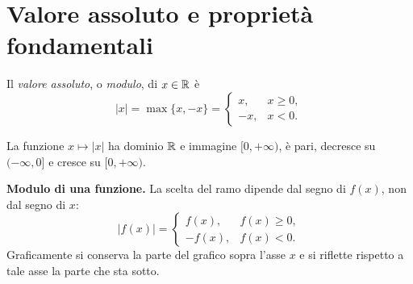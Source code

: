 \section{Valore assoluto e proprietà fondamentali}

\begin{definizione}
Il \emph{valore assoluto}, o \emph{modulo}, di $x\in\mathbb{R}$ è
\[
|x|=\max\{x,-x\}=\begin{cases}
x,&x\ge0,\\
-x,&x<0.
\end{cases}
\]
\end{definizione}

La funzione $x\mapsto|x|$ ha dominio $\mathbb{R}$ e immagine $[0,+\infty)$, è pari, decresce su $(-\infty,0]$ e cresce su $[0,+\infty)$.

\begin{schema}
\end{schema}

\textbf{Modulo di una funzione.} La scelta del ramo dipende dal segno di \emph{$f(x)$}, non dal segno di $x$:
\[
|f(x)|=\begin{cases}
f(x),&f(x)\ge0,\\
-f(x),&f(x)<0.
\end{cases}
\]
Graficamente si conserva la parte del grafico sopra l'asse $x$ e si riflette rispetto a tale asse la parte che sta sotto.

